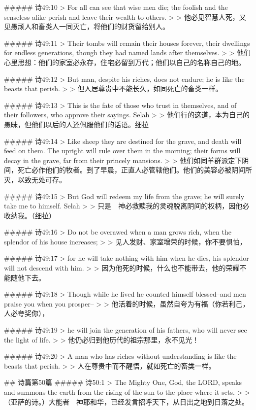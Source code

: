 ##### 诗49:10
> For all can see that wise men die; the foolish and the senseless alike perish and leave their wealth to others.
>
> 他必见智慧人死，又见愚顽人和畜类人一同灭亡，将他们的财货留给别人。


##### 诗49:11
> Their tombs will remain their houses forever, their dwellings for endless generations, though they had named lands after themselves.
>
> 他们心里思想：他们的家室必永存，住宅必留到万代；他们以自己的名称自己的地。


##### 诗49:12
> But man, despite his riches, does not endure; he is like the beasts that perish.
>
> 但人居尊贵中不能长久，如同死亡的畜类一样。


##### 诗49:13
> This is the fate of those who trust in themselves, and of their followers, who approve their sayings. Selah
>
> 他们行的这道，本为自己的愚昧，但他们以后的人还佩服他们的话语。细拉


##### 诗49:14
> Like sheep they are destined for the grave, and death will feed on them. The upright will rule over them in the morning; their forms will decay in the grave, far from their princely mansions.
>
> 他们如同羊群派定下阴间，死亡必作他们的牧者。到了早晨，正直人必管辖他们。他们的美容必被阴间所灭，以致无处可存。


##### 诗49:15
> But God will redeem my life from the grave; he will surely take me to himself. Selah
>
> 只是　神必救赎我的灵魂脱离阴间的权柄，因他必收纳我。（细拉）


##### 诗49:16
> Do not be overawed when a man grows rich, when the splendor of his house increases;
>
> 见人发财、家室增荣的时候，你不要惧怕，


##### 诗49:17
> for he will take nothing with him when he dies, his splendor will not descend with him.
>
> 因为他死的时候，什么也不能带去，他的荣耀不能随他下去。


##### 诗49:18
> Though while he lived he counted himself blessed--and men praise you when you prosper--
>
> 他活着的时候，虽然自夸为有福（你若利己，人必夸奖你），


##### 诗49:19
> he will join the generation of his fathers, who will never see the light of life.
>
> 他仍必归到他历代的祖宗那里，永不见光！


##### 诗49:20
> A man who has riches without understanding is like the beasts that perish.
>
> 人在尊贵中而不醒悟，就如死亡的畜类一样。


## 诗篇第50篇
##### 诗50:1
> The Mighty One, God, the LORD, speaks and summons the earth from the rising of the sun to the place where it sets.
>
> （亚萨的诗。）大能者　神耶和华，已经发言招呼天下，从日出之地到日落之处。


